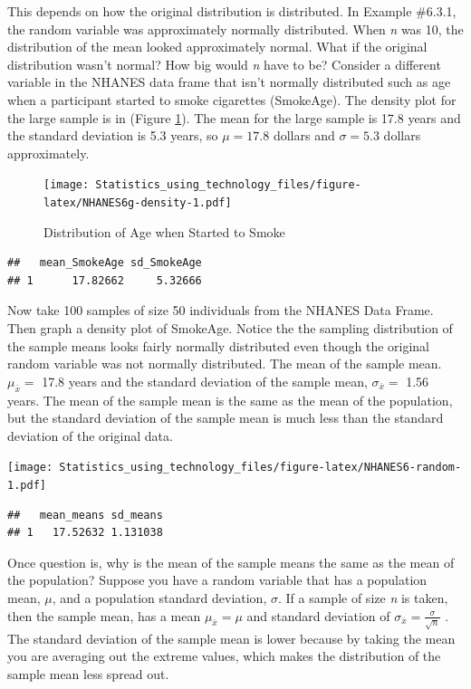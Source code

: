 \documentclass[
]{book}
\begin{document}
This depends on how the original distribution is distributed. In Example \#6.3.1, the random variable was approximately normally distributed. When \emph{n} was 10, the distribution of the mean looked approximately normal. What if the original distribution wasn't normal? How big would \emph{n} have to be? Consider a different variable in the NHANES data frame that isn't normally distributed such as age when a participant started to smoke cigarettes (SmokeAge). The density plot for the large sample is in (Figure \ref{fig:NHANES6g-density}). The mean for the large sample is 17.8 years and the standard deviation is 5.3 years, so \(\mu=17.8\) dollars and \(\sigma=5.3\) dollars approximately.



\begin{figure}
\centering
\texttt{[image: Statistics\_using\_technology\_files/figure-latex/NHANES6g-density-1.pdf]}
\caption{\label{fig:NHANES6g-density}Distribution of Age when Started to Smoke}
\end{figure}

\begin{verbatim}
##   mean_SmokeAge sd_SmokeAge
## 1      17.82662     5.32666
\end{verbatim}

Now take 100 samples of size 50 individuals from the NHANES Data Frame. Then graph a density plot of SmokeAge. Notice the the sampling distribution of the sample means looks fairly normally distributed even though the original random variable was not normally distributed. The mean of the sample mean. \(\mu_{ \bar{x}}=\) 17.8 years and the standard deviation of the sample mean, \(\sigma_{\bar{x}}=\) 1.56 years. The mean of the sample mean is the same as the mean of the population, but the standard deviation of the sample mean is much less than the standard deviation of the original data.

\texttt{[image: Statistics\_using\_technology\_files/figure-latex/NHANES6-random-1.pdf]}

\begin{verbatim}
##   mean_means sd_means
## 1   17.52632 1.131038
\end{verbatim}

Once question is, why is the mean of the sample means the same as the mean of the population? Suppose you have a random variable that has a population mean, \(\mu\), and a population standard deviation, \(\sigma\). If a sample of size \emph{n} is taken, then the sample mean, has a mean \(\mu_{ \bar{x}}=\mu\) and standard deviation of \(\sigma_{ \bar{x}}=\frac{\sigma}{\sqrt{n}}\) . The standard deviation of the sample mean is lower because by taking the mean you are averaging out the extreme values, which makes the distribution of the sample mean less spread out.
\end{document}
